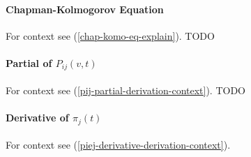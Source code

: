 

\paragraph{Chapman-Kolmogorov Equation} \label{chap-komo-eq-deriv}
For context see (\ref{chap-komo-eq-explain}).
TODO

\paragraph{Partial of $P_{ij}(v,t)$} \label{pij-partial-derivation}
For context see (\ref{pij-partial-derivation-context}).
TODO

\paragraph{Derivative of $\pi_j(t)$} \label{piej-derivative-derivation}
For context see (\ref{piej-derivative-derivation-context}).

\begin{equation*} \begin{split}
\end{split} \end{equation*}

